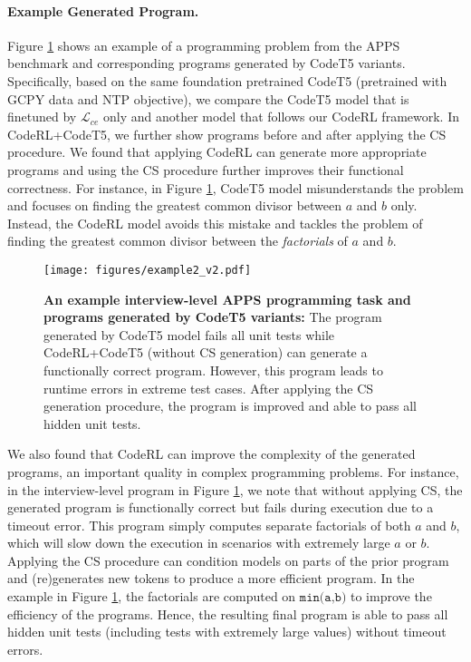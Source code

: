 \documentclass{article}
\begin{document}
\paragraph{Example Generated Program.}
Figure \ref{app_fig:example_program2} shows an example of a programming problem from the APPS benchmark and corresponding programs generated by CodeT5 variants. 
Specifically, based on the same foundation pretrained CodeT5 (pretrained with GCPY data and NTP objective), we compare the CodeT5 model that is finetuned by $\mathcal{L}_{ce}$ only and another model that follows our CodeRL framework.
In CodeRL+CodeT5, we further show programs before and after applying the CS procedure. 
We found that applying CodeRL can generate more appropriate programs and using the CS procedure further improves their functional correctness. 
For instance, in Figure \ref{app_fig:example_program2}, CodeT5 model misunderstands the problem and focuses on finding the greatest common divisor between $a$ and $b$ only.
Instead, the CodeRL model avoids this mistake and tackles the problem of finding the greatest common divisor between the \emph{factorials} of $a$ and $b$.

\begin{figure}[t]
	\centering
	\resizebox{1.0\textwidth}{!} {
	\texttt{[image: figures/example2\_v2.pdf]}
	}
	\caption{
	\textbf{An example interview-level APPS programming task and programs generated by CodeT5 variants:}
	The program generated by CodeT5 model fails all unit tests while CodeRL+CodeT5 (without CS generation) can generate a functionally correct program.
	However, this program leads to runtime errors in extreme test cases.
	After applying the CS generation procedure, the program is improved and able to pass all hidden unit tests. 
	}
	\label{app_fig:example_program2}
\end{figure}

We also found that CodeRL can improve the complexity of the generated programs, an important quality in complex programming problems. 
For instance, in the interview-level program in Figure \ref{app_fig:example_program2}, we note that without applying CS, the generated program is functionally correct but fails during execution due to a timeout error.
This program simply computes separate factorials of both $a$ and $b$, which will slow down the execution in scenarios with extremely large $a$ or $b$. 
Applying the CS procedure can condition models on parts of the prior program and (re)generates new tokens to produce a more efficient program.
In the example in Figure \ref{app_fig:example_program2}, the factorials are computed on $\texttt{min(a,b)}$ to improve the efficiency of the programs. 
Hence, the resulting final program is able to pass all hidden unit tests (including tests with extremely large values) without timeout errors. 
\end{document}

